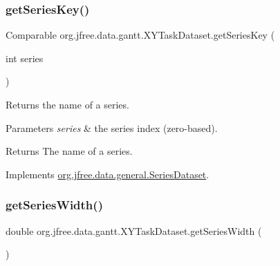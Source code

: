 \mbox{\label{classorg_1_1jfree_1_1data_1_1gantt_1_1_x_y_task_dataset_a6e0246de767964c1ae66fbdc3a2f4eb3}} 
\subsubsection{\texorpdfstring{get\+Series\+Key()}{getSeriesKey()}}
{\footnotesize\ttfamily Comparable org.\+jfree.\+data.\+gantt.\+X\+Y\+Task\+Dataset.\+get\+Series\+Key (\begin{DoxyParamCaption}\item[{int}]{series }\end{DoxyParamCaption})}

Returns the name of a series.


\begin{DoxyParams}{Parameters}
{\em series} & the series index (zero-\/based).\\
\hline
\end{DoxyParams}
\begin{DoxyReturn}{Returns}
The name of a series. 
\end{DoxyReturn}


Implements \mbox{\hyperlink{interfaceorg_1_1jfree_1_1data_1_1general_1_1_series_dataset_a60488892b2314a05a012999e26a74178}{org.\+jfree.\+data.\+general.\+Series\+Dataset}}.

\mbox{\label{classorg_1_1jfree_1_1data_1_1gantt_1_1_x_y_task_dataset_ab358434afb5a7ceb22e72c08a07115b1}} 
\subsubsection{\texorpdfstring{get\+Series\+Width()}{getSeriesWidth()}}
{\footnotesize\ttfamily double org.\+jfree.\+data.\+gantt.\+X\+Y\+Task\+Dataset.\+get\+Series\+Width (\begin{DoxyParamCaption}{ }\end{DoxyParamCaption})}

